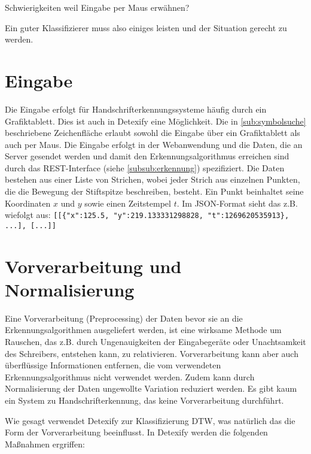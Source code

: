 \TODO Schwierigkeiten weil Eingabe per Maus erwähnen?

Ein guter Klassifizierer muss also einiges leisten und der Situation gerecht zu werden.

\section{Eingabe}
\label{sec:input}

Die Eingabe erfolgt für Handschrifterkennungssysteme häufig durch ein Grafiktablett. Dies ist auch in Detexify eine Möglichkeit. Die in \ref{sub:symbolsuche} beschriebene Zeichenfläche erlaubt sowohl die Eingabe über ein Grafiktablett als auch per Maus. Die Eingabe erfolgt in der Webanwendung und die Daten, die an Server gesendet werden und damit den Erkennungsalgorithmus erreichen sind durch das \ac{REST}-Interface (siehe \ref{subsub:erkennung}) spezifiziert. Die Daten bestehen aus einer Liste von Strichen, wobei jeder Strich aus einzelnen Punkten, die die Bewegung der Stiftspitze beschreiben, besteht. Ein Punkt beinhaltet seine Koordinaten $x$ und $y$ sowie einen Zeitstempel $t$. Im \ac{JSON}-Format sieht das z.B. wiefolgt aus: \lstinline![[{"x":125.5, "y":219.133331298828, "t":1269620535913}, ...], [...]]!

\section{Vorverarbeitung und Normalisierung} %
\label{sec:preprocessing_und_normalisierung}

Eine Vorverarbeitung (Preprocessing) der Daten bevor sie an die Erkennungsalgorithmen ausgeliefert werden, ist eine wirksame Methode um Rauschen, das z.B. durch Ungenauigkeiten der Eingabegeräte oder Unachtsamkeit des Schreibers, entstehen kann, zu relativieren. Vorverarbeitung kann aber auch überflüssige Informationen entfernen, die vom verwendeten Erkennungsalgorithmus nicht verwendet werden. Zudem kann durch Normalisierung der Daten ungewollte Variation reduziert werden. Es gibt kaum ein System zu Handschrifterkennung, das keine Vorverarbeitung durchführt.

Wie gesagt verwendet Detexify zur Klassifizierung \ac{DTW}, was natürlich das die Form der Vorverarbeitung beeinflusst. In Detexify werden die folgenden Maßnahmen ergriffen:

